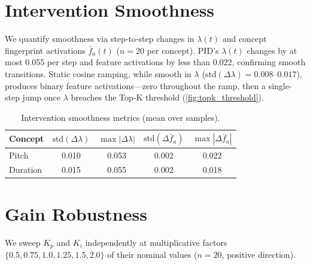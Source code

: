 \documentclass{article}
\theoremstyle{plain}
\begin{document}
\section{Intervention Smoothness}
\label{app:smoothness}

We quantify smoothness via step-to-step changes in $\lambda(t)$ and concept fingerprint activations $\bar{f}_a(t)$ ($n{=}20$ per concept). PID's $\lambda(t)$ changes by at most 0.055 per step and feature activations by less than 0.022, confirming smooth transitions. Static cosine ramping, while smooth in $\lambda$ ($\text{std}(\Delta\lambda){=}0.008$--$0.017$), produces binary feature activations---zero throughout the ramp, then a single-step jump once $\lambda$ breaches the Top-K threshold (\cref{fig:topk_threshold}).

\begin{table}[h]
  \caption{Intervention smoothness metrics (mean over samples).}
  \label{tab:smoothness}
  \begin{center}
  \begin{small}
  \begin{tabular}{lcccc}
    \toprule
    Concept & $\text{std}(\Delta\lambda)$ & $\max|\Delta\lambda|$ & $\text{std}(\Delta\bar{f}_a)$ & $\max|\Delta\bar{f}_a|$ \\
    \midrule
    Pitch & 0.010 & 0.053 & 0.002 & 0.022 \\
    Duration & 0.015 & 0.055 & 0.002 & 0.018 \\
    \bottomrule
  \end{tabular}
  \end{small}
  \end{center}
\end{table}



\section{Gain Robustness}
\label{app:gain_robustness}

We sweep $K_p$ and $K_i$ independently at multiplicative factors $\{0.5, 0.75, 1.0, 1.25, 1.5, 2.0\}$ of their nominal values ($n{=}20$, positive direction).
\end{document}
